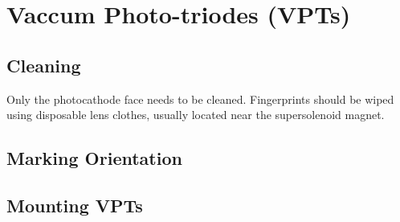 
\section{Vaccum Photo-triodes (VPTs)}
\label{sec:op_vpt}

\subsection{Cleaning}
\label{sec:op_vpt:cleaning}

Only the photocathode face needs to be cleaned.  Fingerprints should be wiped using disposable lens clothes, usually located near the supersolenoid magnet.

\subsection{Marking Orientation}
\label{sec:op_vpt:orienting}

\subsection{Mounting VPTs}
\label{sec:op_vpt:mounting}

